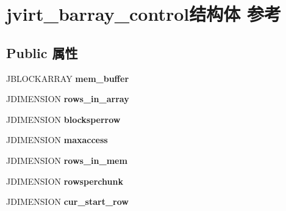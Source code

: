 \hypertarget{structjvirt__barray__control}{}\section{jvirt\+\_\+barray\+\_\+control结构体 参考}
\label{structjvirt__barray__control}
\subsection*{Public 属性}
\begin{DoxyCompactItemize}
\item 
\mbox{\label{structjvirt__barray__control_a8afb55dcf60348a5ae746e19315f745e}} 
J\+B\+L\+O\+C\+K\+A\+R\+R\+AY {\bfseries mem\+\_\+buffer}
\item 
\mbox{\label{structjvirt__barray__control_a57c1bf0ff557df3e1e0926e367a6b635}} 
J\+D\+I\+M\+E\+N\+S\+I\+ON {\bfseries rows\+\_\+in\+\_\+array}
\item 
\mbox{\label{structjvirt__barray__control_a6c148bce80b027c114ec7d37221cd175}} 
J\+D\+I\+M\+E\+N\+S\+I\+ON {\bfseries blocksperrow}
\item 
\mbox{\label{structjvirt__barray__control_a47ffc73c735353eaac752145847cfc92}} 
J\+D\+I\+M\+E\+N\+S\+I\+ON {\bfseries maxaccess}
\item 
\mbox{\label{structjvirt__barray__control_a23aa025027bba6a29287b1460d72bf71}} 
J\+D\+I\+M\+E\+N\+S\+I\+ON {\bfseries rows\+\_\+in\+\_\+mem}
\item 
\mbox{\label{structjvirt__barray__control_ad31f701b81d11db2bd5fa33579d9674e}} 
J\+D\+I\+M\+E\+N\+S\+I\+ON {\bfseries rowsperchunk}
\item 
\mbox{\label{structjvirt__barray__control_ae1e7828cda2f39e8ffdd7e0cc4336f76}} 
J\+D\+I\+M\+E\+N\+S\+I\+ON {\bfseries cur\+\_\+start\+\_\+row}
\item 
\mbox{\label{structjvirt__barray__control_aa4bba1a9fc9dfdbb43d926f27016bb08}} 

\end{DoxyCompactItemize}
